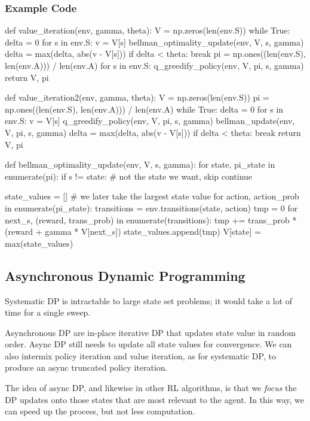 \documentclass[lang=en,mode=geye,device=normal,color=blue,14pt]{elegantnote}
\DeclareMathOperator*{\1}{\mathbbm{1}}
\begin{document}
\subsubsection{Example Code}
\begin{python}
def value_iteration(env, gamma, theta):
    V = np.zeros(len(env.S))
    while True:
        delta = 0
        for s in env.S:
            v = V[s]
            bellman_optimality_update(env, V, s, gamma)
            delta = max(delta, abs(v - V[s]))
        if delta < theta:
            break
    pi = np.ones((len(env.S), len(env.A))) / len(env.A)
    for s in env.S:
        q_greedify_policy(env, V, pi, s, gamma)
    return V, pi

def value_iteration2(env, gamma, theta):
    V = np.zeros(len(env.S))
    pi = np.ones((len(env.S), len(env.A))) / len(env.A)
    while True:
        delta = 0
        for s in env.S:
            v = V[s]
            q_greedify_policy(env, V, pi, s, gamma)
            bellman_update(env, V, pi, s, gamma)
            delta = max(delta, abs(v - V[s]))
        if delta < theta:
            break
    return V, pi

def bellman_optimality_update(env, V, s, gamma):
    for state, pi_state in enumerate(pi):
        if s != state:  # not the state we want, skip
            continue

        state_values = [] # we later take the largest state value
        for action, action_prob in enumerate(pi_state):
            transitions = env.transitions(state, action)
            tmp = 0
            for next_s, (reward, trans_prob) in enumerate(transitions):
                tmp += trans_prob * (reward + gamma * V[next_s])
            state_values.append(tmp)
        V[state] = max(state_values)
\end{python}

\subsection{Asynchronous Dynamic Programming}

Systematic DP is intractable to large state set problems; it would take a lot of time for a single sweep.

Asynchronous DP are in-place iterative DP that updates state value in random order. Async DP still needs to update all state values for convergence. We can also intermix policy iteration and value iteration, as for systematic DP, to produce an async truncated policy iteration.

The idea of async DP, and likewise in other RL algorithms, is that we \textit{focus} the DP updates onto those states that are most relevant to the agent. In this way, we can speed up the process, but not less computation.
\end{document}
